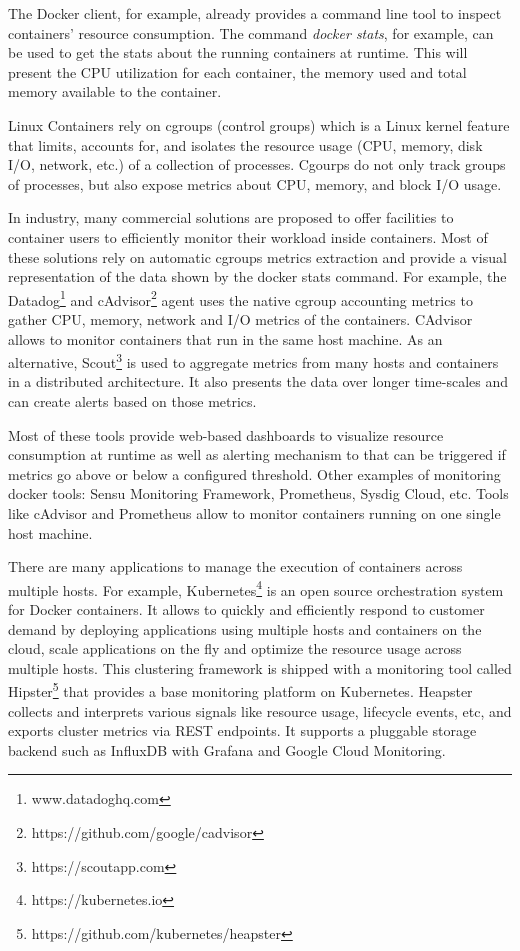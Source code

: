 The Docker client, for example, already provides a command line tool to inspect containers’ resource consumption. The command \textit{docker stats}, for example, can be used to get the stats about the running containers at runtime. This will present the CPU utilization for each container, the memory used and total memory available to the container.

Linux Containers rely on cgroups (control groups) which is a Linux kernel feature that limits, accounts for, and isolates the resource usage (CPU, memory, disk I/O, network, etc.) of a collection of processes.
Cgourps do not only track groups of processes, but also expose metrics about CPU, memory, and block I/O usage. 

In industry, many commercial solutions are proposed to offer facilities to container users to efficiently monitor their workload inside containers. Most of these solutions rely on automatic cgroups metrics extraction and provide a visual representation of the data shown by the docker stats command. For example, the Datadog\footnote{www.datadoghq.com} and cAdvisor\footnote{https://github.com/google/cadvisor} agent uses the native cgroup accounting metrics to gather CPU, memory, network and I/O metrics of the containers. CAdvisor allows to monitor containers that run in the same host machine. As an alternative, Scout\footnote{https://scoutapp.com} is used to aggregate metrics from many hosts and containers in a distributed architecture. It also presents the data over longer time-scales and can create alerts based on those metrics. 

Most of these tools provide web-based dashboards to visualize resource consumption at runtime as well as alerting mechanism to that can be triggered if metrics go above or below a configured threshold. Other examples of monitoring docker tools: Sensu Monitoring Framework, Prometheus, Sysdig Cloud, etc.
Tools like cAdvisor and Prometheus allow to monitor containers running on one single host machine. 

There are many applications to manage the execution of containers across multiple hosts. For example, Kubernetes\footnote{https://kubernetes.io} is an open source orchestration system for Docker containers. It allows to quickly and efficiently respond to customer demand by deploying applications using multiple hosts and containers on the cloud, scale applications on the fly and optimize the resource usage across multiple hosts. This clustering framework is shipped with a monitoring tool called Hipster\footnote{https://github.com/kubernetes/heapster} that provides a base monitoring platform on Kubernetes. Heapster collects and interprets various signals like resource usage, lifecycle events, etc, and exports cluster metrics via REST endpoints. It supports a pluggable storage backend such as InfluxDB with Grafana and Google Cloud Monitoring.


